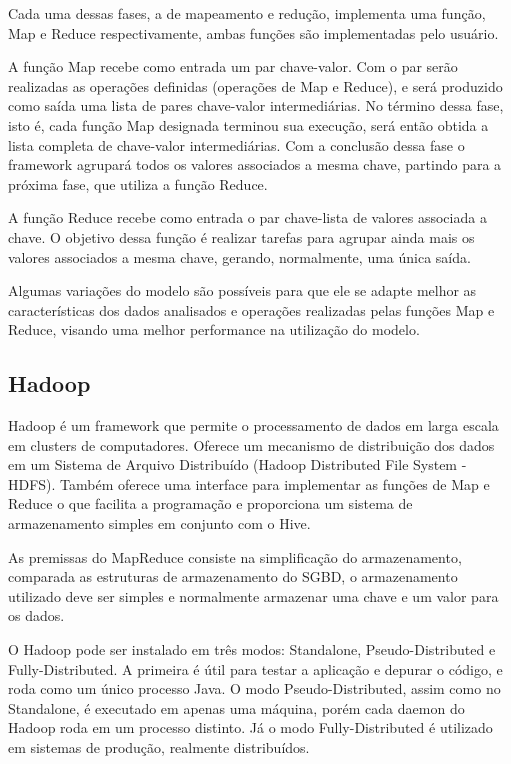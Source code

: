 \documentclass[a4paper,12pt]{article}
\begin{document}
Cada uma dessas fases, a de mapeamento e redução, implementa uma função, Map e 
Reduce respectivamente, ambas funções são implementadas pelo usuário.

A função Map recebe como entrada um par chave-valor. Com o par serão realizadas
as operações definidas (operações de Map e Reduce), e será produzido como saída
uma lista de pares chave-valor intermediárias. No término dessa fase, isto é,
cada função Map designada terminou sua execução, será então obtida a lista
completa de chave-valor intermediárias. Com a conclusão dessa fase o framework
agrupará todos os valores associados a mesma chave, partindo para a próxima fase,
que utiliza a função Reduce.

A função Reduce recebe como entrada o par chave-lista de valores associada a
chave. O objetivo dessa função é realizar tarefas para agrupar ainda mais os
valores associados a mesma chave, gerando, normalmente, uma única saída.

Algumas variações do modelo são possíveis para que ele se adapte melhor as
características dos dados analisados e operações realizadas pelas funções Map e
Reduce, visando uma melhor performance na utilização do modelo. 

\subsection{\textbf{Hadoop}}

Hadoop é um framework que permite o processamento de dados em larga escala em
clusters de computadores. Oferece um mecanismo de distribuição dos dados em um
Sistema de Arquivo Distribuído (Hadoop Distributed File System - HDFS). Também
oferece uma interface para implementar as funções de Map e Reduce o que facilita
a programação e proporciona um sistema de armazenamento simples em conjunto com
o Hive.

As premissas do MapReduce consiste na simplificação do armazenamento, comparada
as estruturas de armazenamento do SGBD, o armazenamento utilizado deve ser
simples e normalmente armazenar uma chave e um valor para os dados.

O Hadoop pode ser instalado em três modos: Standalone, Pseudo-Distributed e
Fully-Distributed. A primeira é útil para testar a aplicação e depurar o código,
e roda como um único processo Java. O modo Pseudo-Distributed, assim como no
Standalone, é executado em apenas uma máquina, porém cada daemon do Hadoop roda
em um processo distinto. Já o modo Fully-Distributed é utilizado em sistemas de
produção, realmente distribuídos.	
\end{document}
